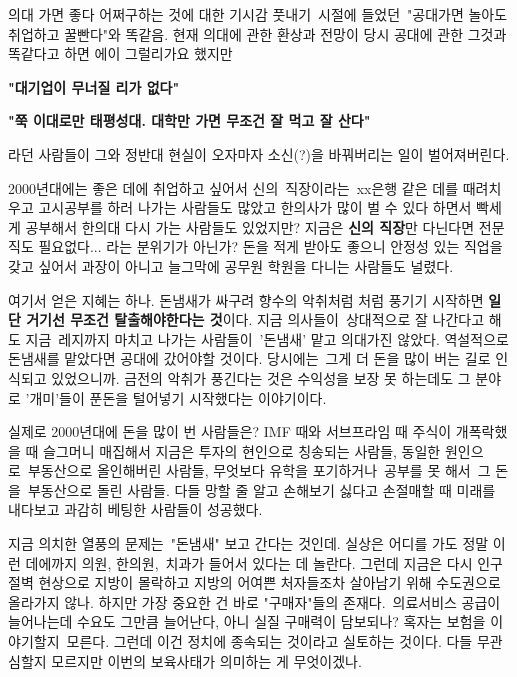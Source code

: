 \vspace{5mm}

의대 가면 좋다 어쩌구하는 것에 대한 기시감
풋내기 시절에 들었던 "공대가면 놀아도 취업하고 꿀빤다"와 똑같음.
현재 의대에 관한 환상과 전망이 당시 공대에 관한 그것과 똑같다고 하면 에이 그럴리가요 했지만
\vspace{5mm}

\textbf{"대기업이 무너질 리가 없다"}

\textbf{"쭉 이대로만 태평성대. 대학만 가면 무조건 잘 먹고 잘 산다"}

라던 사람들이 그와 정반대 현실이 오자마자 소신(?)을 바꿔버리는 일이 벌어져버린다.
\vspace{5mm}

2000년대에는 좋은 데에 취업하고 싶어서
신의 직장이라는 xx은행 같은 데를 때려치우고 고시공부를 하러 나가는 사람들도 많았고
한의사가 많이 벌 수 있다 하면서 빡세게 공부해서 한의대 다시 가는 사람들도 있었지만?
지금은 \textbf{신의 직장}만 다닌다면 전문직도 필요없다... 라는 분위기가 아닌가?
돈을 적게 받아도 좋으니 안정성 있는 직업을 갖고 싶어서 과장이 아니고 늘그막에 공무원 학원을 다니는 사람들도 널렸다.
\vspace{5mm}

여기서 얻은 지혜는 하나.
돈냄새가 싸구려 향수의 악취처럼 처럼 풍기기 시작하면 \textbf{일단 거기선 무조건 탈출해야한다는 것}이다.
지금 의사들이 상대적으로 잘 나간다고 해도 지금 레지까지 마치고 나가는 사람들이 '돈냄새' 맡고 의대가진 않았다.
역설적으로 돈냄새를 맡았다면 공대에 갔어야할 것이다. 당시에는 그게 더 돈을 많이 버는 길로 인식되고 있었으니까.
금전의 악취가 풍긴다는 것은 수익성을 보장 못 하는데도 그 분야로 '개미'들이 푼돈을 털어넣기 시작했다는 이야기이다.
\vspace{5mm}

실제로 2000년대에 돈을 많이 번 사람들은?
IMF 때와 서브프라임 때 주식이 개폭락했을 때 슬그머니 매집해서 지금은 투자의 현인으로 칭송되는 사람들,
동일한 원인으로 부동산으로 올인해버린 사람들, 무엇보다 유학을 포기하거나 공부를 못 해서 그 돈을 부동산으로 돌린 사람들.
다들 망할 줄 알고 손해보기 싫다고 손절매할 때 미래를 내다보고 과감히 베팅한 사람들이 성공했다.
\vspace{5mm}

지금 의치한 열풍의 문제는 "돈냄새" 보고 간다는 것인데.
실상은 어디를 가도 정말 이런 데에까지 의원, 한의원, 치과가 들어서 있다는 데 놀란다.
그런데 지금은 다시 인구 절벽 현상으로 지방이 몰락하고 지방의 어여쁜 처자들조차 살아남기 위해 수도권으로 올라가지 않나.
하지만 가장 중요한 건 바로 "구매자"들의 존재다. 의료서비스 공급이 늘어나는데 수요도 그만큼 늘어난다, 아니 실질 구매력이 담보되나?
혹자는 보험을 이야기할지 모른다. 그런데 이건 정치에 종속되는 것이라고 실토하는 것이다.
다들 무관심할지 모르지만 이번의 보육사태가 의미하는 게 무엇이겠나.
\vspace{5mm}

